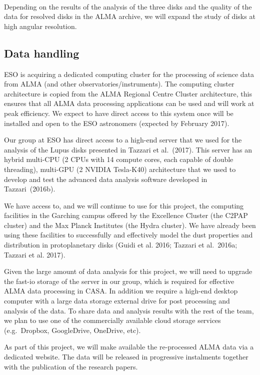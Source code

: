 \documentclass[10pt,fleqn,twoside]{article}
\begin{document}
\vspace{1em}{\Tcol\bf Months 25-36}\\
Depending on the results of the analysis of the three disks and the quality of the data for resolved disks in the ALMA archive, we will expand the study of disks at high angular resolution. 

\subsection{Data handling}

ESO is acquiring a dedicated computing cluster for the processing of science data from ALMA (and other observatories/instruments). The computing cluster architecture is copied from the ALMA Regional Centre Cluster architecture, this ensures that all ALMA data processing applications can be used and will work at peak efficiency. We expect to have direct access to this system once will be installed and open to the ESO astronomers (expected by February 2017). 

Our group at ESO has direct access to a high-end server that we used for the analysis of the Lupus disks presented in Tazzari et al.~(2017). This server has an hybrid multi-CPU (2 CPUs with 14 compute cores, each capable of double threading), multi-GPU (2 NVIDIA Tesla-K40) architecture that we used to develop and test the advanced data analysis software developed in Tazzari~(2016b). 

We have access to, and we will continue to use for this project, the computing facilities in the Garching campus offered by the Excellence Cluster (the C2PAP cluster) and the Max Planck Institutes (the Hydra cluster). We have already been using these facilities to successfully and effectively model the dust properties and distribution in protoplanetary disks (Guidi et al. 2016; Tazzari et al.~2016a; Tazzari et al. 2017).

Given the large amount of data analysis for this project, we will need to upgrade the fast-io storage of the server in our group, which is required for effective ALMA data processing in CASA. In addition we require a high-end desktop computer with a large data storage external drive for post processing and analysis of the data. To share data and analysis results with the rest of the team, we plan to use one of the commercially available cloud storage services (e.g.\ Dropbox, GoogleDrive, OneDrive, etc). 

As part of this project, we will make available the re-processed ALMA data via a dedicated website. The data will be released in progressive instalments together with the publication of the research papers.
\end{document}
